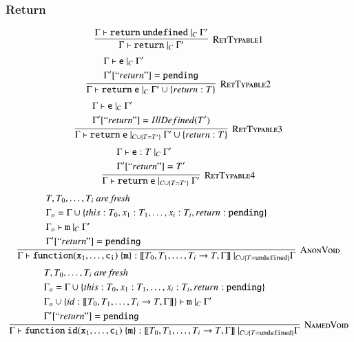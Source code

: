 \documentclass[12pt,a4paper,twoside,openright]{report}
\theoremstyle{definition}
\theoremstyle{dotless}
\begin{document}
\subsubsection*{Return}

$$\infer[\textsc{RetTypable1}]{
  \Gamma \vdash \mathtt{return}\ |_C\ \Gamma'
}{
  \Gamma \vdash \mathtt{return\ undefined}\ |_C\ \Gamma'
}$$
$$\infer[\textsc{RetTypable2}]{
  \Gamma \vdash \mathtt{return\ e}\ |_C\ \Gamma'\cup\{return: T\}
}{
  \begin{split}
	&\Gamma \vdash \mathtt{e}\ |_C\ \Gamma'\\
	&\Gamma'[``return"] = \mathtt{pending}
  \end{split}
}$$
$$\infer[\textsc{RetTypable3}]{
  \Gamma \vdash \mathtt{return\ e}\ |_{C\cup\{T=T'\}}\ \Gamma'\cup\{return: T\}
}{
  \begin{split}
	&\Gamma \vdash \mathtt{e}\ |_C\ \Gamma'\\
	&\Gamma'[``return"] = IllDefined(T')
  \end{split}
}$$
$$\infer[\textsc{RetTypable4}]{
  \Gamma \vdash \mathtt{return\ e}\ |_{C\cup\{T=T'\}}\ \Gamma'
}{
  \begin{split}
	&\Gamma \vdash \mathtt{e}:T\ |_C\ \Gamma'\\
	&\Gamma'[``return"] = T'
  \end{split}
}$$
$$\infer[\textsc{AnonVoid}]{
  \Gamma\vdash\mathtt{function(x_1, \dots, c_i)\ \{m\}}:[\![T_0, T_1, \dots, T_i\rightarrow T, \Gamma]\!]\ |_{C\cup \{T=\mathtt{undefined}\}} \Gamma
}{
  \begin{split}
	&T, T_0, \dots, T_i\textit{ are fresh} \\
  	&\Gamma_o = \Gamma\cup\{this:T_0, x_1:T_1, \dots, x_i:T_i, return: \mathtt{pending}\} \\ 
  	&\Gamma_o \vdash \mathtt{m}\ |_C\ \Gamma'\\
  	&\Gamma'[``return"] = \mathtt{pending}
  \end{split}
}$$
$$\infer[\textsc{NamedVoid}]{
  \Gamma\vdash\mathtt{function\ id(x_1, \dots, c_i)\ \{m\}}:[\![T_0, T_1, \dots, T_i\rightarrow T, \Gamma]\!]\ |_{C\cup \{T=\mathtt{undefined}\}} \Gamma
}{
  \begin{split}
	&T, T_0, \dots, T_i\textit{ are fresh} \\
  	&\Gamma_o = \Gamma\cup\{this:T_0, x_1:T_1, \dots, x_i:T_i, return: \mathtt{pending}\} \\ 
	& \Gamma_o\cup \{ id: [\![T_0, T_1, \dots, T_i\rightarrow T, \Gamma]\!]\} \vdash \mathtt{m}\ |_C\ \Gamma'\\
  	&\Gamma'[``return"] = \mathtt{pending}
  \end{split}
}$$
\end{document}
